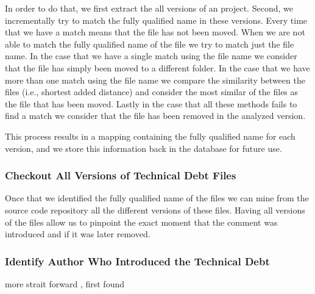 In order to do that, we first extract the all versions of an project. Second, we incrementally try to match the fully qualified name in these versions. Every time that we have a match means that the file has not been moved. When we are not able to match the fully qualified name of the file we try to match just the file name. In the case that we have a single match using the file name we consider that the file has simply been moved to a different folder. In the case that we have more than one match using the file name we compare the similarity between the files (i.e., shortest added distance) and consider the most similar of the files as the file that has been moved. Lastly in the case that all these methods fails to find a match we consider that the file has been removed in the analyzed version.  

This process results in a mapping containing the fully qualified name for each version, and we store this information back in the database for future use.

\subsubsection*{Checkout All Versions of Technical Debt Files}
\label{subsub:checkout_all_versions_of_technical_debt_files}

Once that we identified the fully qualified name of the \SATD files we can mine from the source code repository all the different versions of these files. Having all versions of the \SATD files allow us to pinpoint the exact moment that the \SATD comment was introduced and if it was later removed.






\subsubsection*{Identify Author Who Introduced the Technical Debt}
\label{subsub:identify_author_who_introduced_the_technical_debt}
more strait forward , first found

